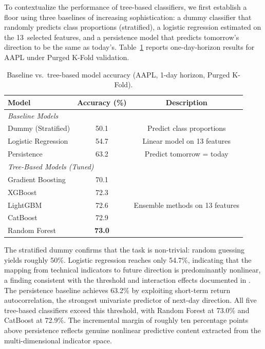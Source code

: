 \documentclass{rQUF2e}
\begin{document}
To contextualize the performance of tree-based classifiers, we first establish a floor using three baselines of increasing sophistication: a dummy classifier that randomly predicts class proportions (stratified), a logistic regression estimated on the 13~selected features, and a persistence model that predicts tomorrow's direction to be the same as today's. Table~\ref{tab:baseline} reports one-day-horizon results for AAPL under Purged K-Fold validation.

\begin{table}[H]
\centering
\caption{Baseline vs.\ tree-based model accuracy (AAPL, 1-day horizon, Purged K-Fold).}
\scriptsize
\label{tab:baseline}
\begin{tabular}{lcc}
\toprule
\textbf{Model} & \textbf{Accuracy (\%)} & \textbf{Description} \\
\midrule
\multicolumn{3}{l}{\textit{Baseline Models}} \\
\quad Dummy (Stratified)    & 50.1 & Predict class proportions \\
\quad Logistic Regression   & 54.7 & Linear model on 13 features \\
\quad Persistence           & 63.2 & Predict tomorrow = today \\
\midrule
\multicolumn{3}{l}{\textit{Tree-Based Models (Tuned)}} \\
\quad Gradient Boosting     & 70.1 & \multirow{5}{*}{Ensemble methods on 13 features} \\
\quad XGBoost               & 72.3 & \\
\quad LightGBM              & 72.6 & \\
\quad CatBoost              & 72.9 & \\
\quad Random Forest         & \textbf{73.0} & \\
\bottomrule
\end{tabular}
\end{table}

\noindent The stratified dummy confirms that the task is non-trivial: random guessing yields roughly 50\%. Logistic regression reaches only 54.7\%, indicating that the mapping from technical indicators to future direction is predominantly nonlinear, a finding consistent with the threshold and interaction effects documented in \citet{gu2020empirical}. The persistence baseline achieves 63.2\% by exploiting short-term return autocorrelation, the strongest univariate predictor of next-day direction. All five tree-based classifiers exceed this threshold, with Random Forest at 73.0\% and CatBoost at 72.9\%. The incremental margin of roughly ten percentage points above persistence reflects genuine nonlinear predictive content extracted from the multi-dimensional indicator space. \\
\end{document}
